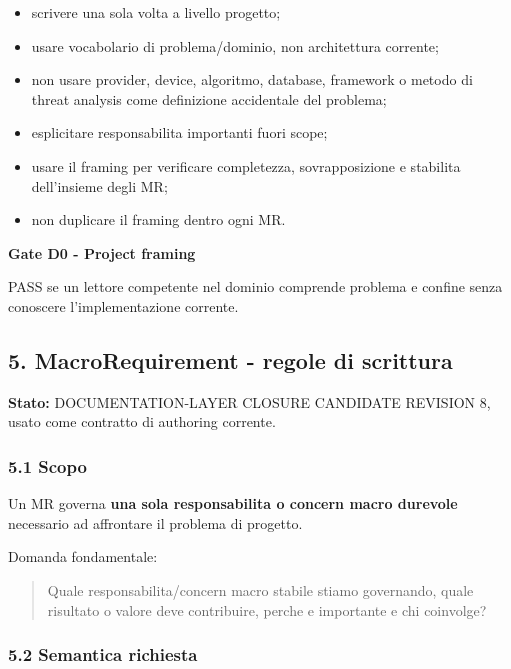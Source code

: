 \documentclass[
  9pt,
  a4paper,
]{article}
\providecommand{\tightlist}{%
  \setlength{\itemsep}{0pt}\setlength{\parskip}{0pt}}
\begin{document}
\begin{itemize}
\tightlist
\item
  scrivere una sola volta a livello progetto;
\item
  usare vocabolario di problema/dominio, non architettura corrente;
\item
  non usare provider, device, algoritmo, database, framework o metodo di
  threat analysis come definizione accidentale del problema;
\item
  esplicitare responsabilita importanti fuori scope;
\item
  usare il framing per verificare completezza, sovrapposizione e
  stabilita dell'insieme degli MR;
\item
  non duplicare il framing dentro ogni MR.
\end{itemize}

\textbf{Gate D0 - Project framing}

PASS se un lettore competente nel dominio comprende problema e confine
senza conoscere l'implementazione corrente.

\subsection{5. MacroRequirement - regole di
scrittura}\label{macrorequirement---regole-di-scrittura}

\textbf{Stato:} DOCUMENTATION-LAYER CLOSURE CANDIDATE REVISION 8, usato
come contratto di authoring corrente.

\subsubsection{5.1 Scopo}\label{scopo}

Un MR governa \textbf{una sola responsabilita o concern macro durevole}
necessario ad affrontare il problema di progetto.

Domanda fondamentale:

\begin{quote}
Quale responsabilita/concern macro stabile stiamo governando, quale
risultato o valore deve contribuire, perche e importante e chi
coinvolge?
\end{quote}

\subsubsection{5.2 Semantica richiesta}\label{semantica-richiesta}
\end{document}
